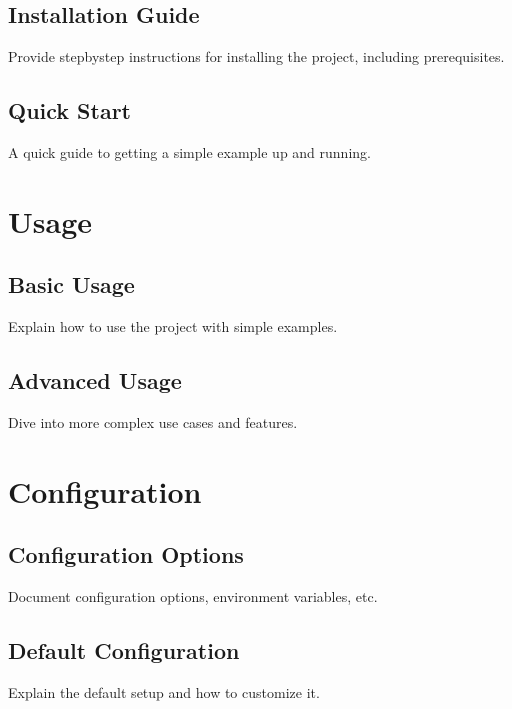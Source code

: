 \documentclass[letterpaper,10pt,english]{sphinxmanual}
\begin{document}
\section{Installation Guide}
\label{\detokenize{getting_started:installation-guide}}
\sphinxAtStartPar
Provide step\sphinxhyphen{}by\sphinxhyphen{}step instructions for installing the project, including prerequisites.


\section{Quick Start}
\label{\detokenize{getting_started:quick-start}}
\sphinxAtStartPar
A quick guide to getting a simple example up and running.

\sphinxstepscope


\chapter{Usage}
\label{\detokenize{usage:usage}}\label{\detokenize{usage::doc}}

\section{Basic Usage}
\label{\detokenize{usage:basic-usage}}
\sphinxAtStartPar
Explain how to use the project with simple examples.


\section{Advanced Usage}
\label{\detokenize{usage:advanced-usage}}
\sphinxAtStartPar
Dive into more complex use cases and features.

\sphinxstepscope


\chapter{Configuration}
\label{\detokenize{configuration:configuration}}\label{\detokenize{configuration::doc}}

\section{Configuration Options}
\label{\detokenize{configuration:configuration-options}}
\sphinxAtStartPar
Document configuration options, environment variables, etc.


\section{Default Configuration}
\label{\detokenize{configuration:default-configuration}}
\sphinxAtStartPar
Explain the default setup and how to customize it.
\end{document}
